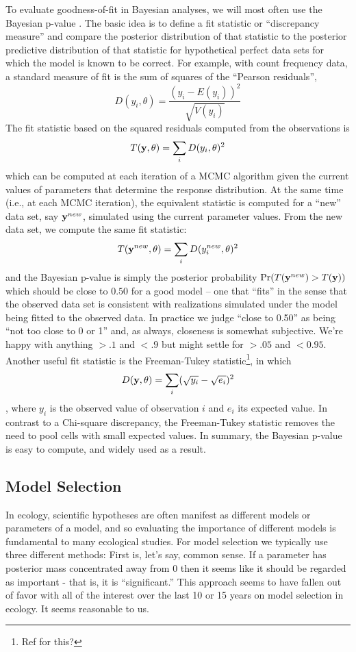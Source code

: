 To evaluate goodness-of-fit in Bayesian analyses, we will most often
use the Bayesian p-value \citep{gelman_etal:1996}.  The basic idea is to define
a fit statistic or ``discrepancy measure'' and compare the posterior distribution of that
statistic to the posterior predictive distribution of that statistic
for hypothetical perfect data sets for which the model is known to be correct. For
example, with count frequency data, a standard measure of fit is the
sum of squares of the ``Pearson residuals'',
\[
D(y_i,\theta) = \frac{(y_i - E(y_i))^{2}}{\sqrt{V( y_{i} )}}
\]
The fit statistic based on the squared residuals computed from the
observations is 
\[
T({\bf y}, \theta) = \sum_{i} D(y_{i},\theta)^{2}
\]
which can be computed at each iteration of a MCMC algorithm given the
current values of parameters that determine the
 response distribution.  At the same time (i.e., at each MCMC
 iteration),
the equivalent statistic is computed for a
``new'' data set, say ${\bf y}^{new}$, 
simulated using the current parameter values. From the new data set,
we compute the same fit statistic:
\[
T({\bf y}^{new}, \theta) = \sum_{i} D(y_{i}^{new},\theta)^{2}
\]
and 
the
Bayesian p-value is simply the posterior probability $\Pr(T({\bf
  y}^{new})  >  T({\bf y}))$
 which should be close to $0.50$ for a good model -- one that
 ``fits'' in the sense that the observed data set is
 consistent with realizations simulated under the model being fitted
 to the observed data. In practice
we judge ``close to 0.50'' as being ``not too close to 0 or 1'' and,
as always, closeness is somewhat subjective. We're happy with anything
$>.1$ and $<.9$ but might settle for $>.05$ and $<0.95$. 
Another useful fit statistic is the Freeman-Tukey
statistic\footnote{Ref for this?}, in which
\[
D({\bf y},\theta) = \sum_{i} ( \sqrt{y_{i}} - \sqrt{e_{i}} )^2
\]
\citep{brooks_etal:2000}, where $y_{i}$ is the observed value of
observation $i$ and $e_{i}$ its expected value. In contrast to a
Chi-square discrepancy, the Freeman-Tukey statistic removes the need
to pool cells with small expected values.
In summary,
the Bayesian p-value is easy to compute,
and widely used as a result.


\subsection{Model Selection }

In ecology, scientific hypotheses are often manifest as different models or parameters
 of a model, and so
evaluating the importance of different models is fundamental 
to many ecological studies.
For model selection we typically use three different methods: First
is, let's say, common sense. If a parameter has posterior mass
concentrated away from 0 then it seems like it should be regarded as
important - that is, it is ``significant.''  This approach seems to
have fallen out of favor with all of the interest over the last 10 or
15 years on model selection in ecology. It seems reasonable to us.



